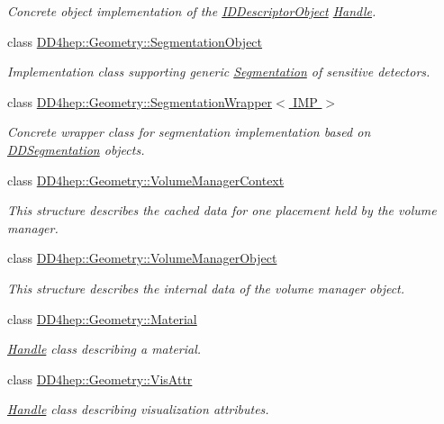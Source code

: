 \begin{DoxyCompactItemize}
\begin{DoxyCompactList}\small\item\em Concrete object implementation of the \hyperlink{class_d_d4hep_1_1_geometry_1_1_i_d_descriptor_object}{IDDescriptorObject} \hyperlink{class_d_d4hep_1_1_handle}{Handle}. \item\end{DoxyCompactList}\item 
class \hyperlink{class_d_d4hep_1_1_geometry_1_1_segmentation_object}{DD4hep::Geometry::SegmentationObject}
\begin{DoxyCompactList}\small\item\em Implementation class supporting generic \hyperlink{class_d_d4hep_1_1_geometry_1_1_segmentation}{Segmentation} of sensitive detectors. \item\end{DoxyCompactList}\item 
class \hyperlink{class_d_d4hep_1_1_geometry_1_1_segmentation_wrapper}{DD4hep::Geometry::SegmentationWrapper$<$ IMP $>$}
\begin{DoxyCompactList}\small\item\em Concrete wrapper class for segmentation implementation based on \hyperlink{namespace_d_d4hep_1_1_d_d_segmentation}{DDSegmentation} objects. \item\end{DoxyCompactList}\item 
class \hyperlink{class_d_d4hep_1_1_geometry_1_1_volume_manager_context}{DD4hep::Geometry::VolumeManagerContext}
\begin{DoxyCompactList}\small\item\em This structure describes the cached data for one placement held by the volume manager. \item\end{DoxyCompactList}\item 
class \hyperlink{class_d_d4hep_1_1_geometry_1_1_volume_manager_object}{DD4hep::Geometry::VolumeManagerObject}
\begin{DoxyCompactList}\small\item\em This structure describes the internal data of the volume manager object. \item\end{DoxyCompactList}\item 
class \hyperlink{class_d_d4hep_1_1_geometry_1_1_material}{DD4hep::Geometry::Material}
\begin{DoxyCompactList}\small\item\em \hyperlink{class_d_d4hep_1_1_handle}{Handle} class describing a material. \item\end{DoxyCompactList}\item 
class \hyperlink{class_d_d4hep_1_1_geometry_1_1_vis_attr}{DD4hep::Geometry::VisAttr}
\begin{DoxyCompactList}\small\item\em \hyperlink{class_d_d4hep_1_1_handle}{Handle} class describing visualization attributes. \item\end{DoxyCompactList}\end{DoxyCompactItemize}
